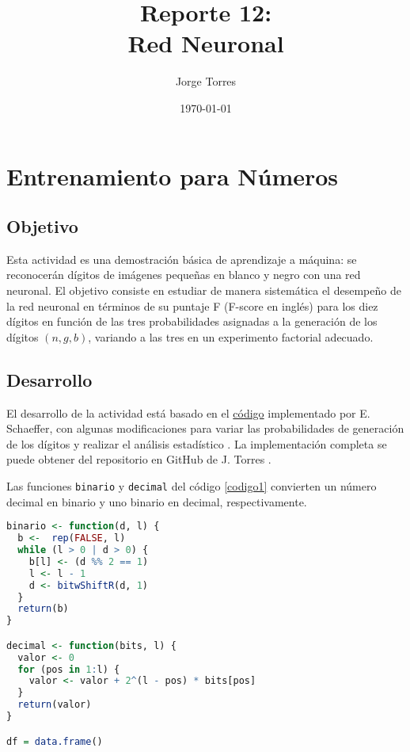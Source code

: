 \documentclass{report}
\title{Reporte 12:\\Red Neuronal}
\author{Jorge Torres}
\date{\today}
\begin{document}
\maketitle

\chapter{Entrenamiento para N\'umeros}\label{cap1}

\section{Objetivo}

Esta actividad es una demostración básica de aprendizaje a m\'aquina: se reconocer\'an d\'igitos de im\'agenes peque\~nas en blanco y negro con una red neuronal. El objetivo consiste en estudiar de manera sistem\'atica el desempeño de la red neuronal en términos de su puntaje F (F-score en ingl\'es) para los diez d\'igitos en funci\'on de las tres probabilidades asignadas a la generaci\'on de los d\'igitos $(n, g, b)$, variando a las tres en un experimento factorial adecuado.

\section{Desarrollo}

El desarrollo de la actividad est\'a basado en el \href{https://github.com/satuelisa/Simulation/blob/master/NeuralNetwork/ann.R}{c\'odigo} implementado por E. Schaeffer, con algunas modificaciones para variar las probabilidades de generaci\'on de los d\'igitos y realizar el an\'alisis estad\'istico \cite{elisa1}. La implementaci\'on completa se puede obtener del repositorio en GitHub de J. Torres \cite{jorge1}.

Las funciones \texttt{binario} y \texttt{decimal} del c\'odigo \ref{codigo1} convierten un n\'umero decimal en binario y uno binario en decimal, respectivamente.

\begin{lstlisting}[caption=Conversiones Binario y Decimal, label=codigo1, language=R]
binario <- function(d, l) {
  b <-  rep(FALSE, l)
  while (l > 0 | d > 0) {
    b[l] <- (d %% 2 == 1)
    l <- l - 1
    d <- bitwShiftR(d, 1)
  }
  return(b)
}

decimal <- function(bits, l) {
  valor <- 0
  for (pos in 1:l) {
    valor <- valor + 2^(l - pos) * bits[pos]
  }
  return(valor)
}

df = data.frame()
\end{lstlisting}
\end{document}
